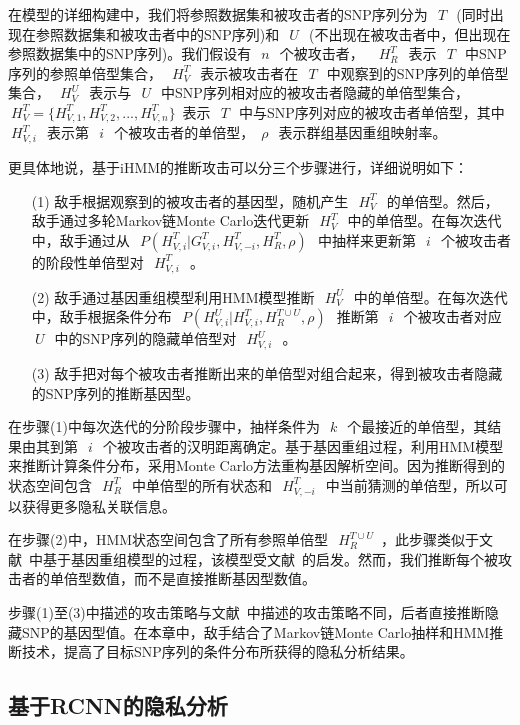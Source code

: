在模型的详细构建中，我们将参照数据集和被攻击者的SNP序列分为~$~T~$~(同时出现在参照数据集和被攻击者中的SNP序列)和~$~U~$~(不出现在被攻击者中，但出现在参照数据集中的SNP序列)。我们假设有~$~n~$~个被攻击者， ~$~H_R^T~$~表示~$~T~$~中SNP序列的参照单倍型集合，~$~H_V^T~$~表示被攻击者在~$~T~$~中观察到的SNP序列的单倍型集合，~$~H_V^U~$~表示与~$~U~$~中SNP序列相对应的被攻击者隐藏的单倍型集合，~$~H_V^T=\{H_{V,1}^T,H_{V,2}^T,..., H_{V,n}^T\}$~表示~$~T~$~中与SNP序列对应的被攻击者单倍型，其中~$~H_{V,i}^T~$~表示第~$~i~$~个被攻击者的单倍型，~$\rho~$~表示群组基因重组映射率。

更具体地说，基于iHMM的推断攻击可以分三个步骤进行，详细说明如下：
\begin{enumerate}
	\item[(1)] 敌手根据观察到的被攻击者的基因型，随机产生~$~H_V^T~$~的单倍型。然后，敌手通过多轮Markov链Monte Carlo迭代更新~$~H_V^T~$~中的单倍型。在每次迭代中，敌手通过从~$~P(H_{V,i}^T|G_{V,i}^T,H_{V,-i}^T,H_R^T,\rho)~$~中抽样来更新第~$~i~$~个被攻击者的阶段性单倍型对~$~H_{V,i}^T~$~。
	\item[(2)] 敌手通过基因重组模型利用HMM模型推断~$~H_V^U~$~中的单倍型。在每次迭代中，敌手根据条件分布~$~P(H_{V,i}^U|H_{V,i}^T, H_R^{T \cup U},\rho)~$~推断第~$~i~$~个被攻击者对应~$~U~$~中的SNP序列的隐藏单倍型对~$~H_{V,i}^U~$~。 
	\item[(3)] 敌手把对每个被攻击者推断出来的单倍型对组合起来，得到被攻击者隐藏的SNP序列的推断基因型。
\end{enumerate}

在步骤(1)中每次迭代的分阶段步骤中，抽样条件为~$~k~$~个最接近的单倍型，其结果由其到第~$~i~$~个被攻击者的汉明距离确定。基于基因重组过程，利用HMM模型来推断计算条件分布，采用Monte Carlo方法重构基因解析空间。因为推断得到的状态空间包含~$~H_R^T~$~中单倍型的所有状态和~$~H_{V,-i}^T~$~中当前猜测的单倍型，所以可以获得更多隐私关联信息。

在步骤(2)中，HMM状态空间包含了所有参照单倍型~$~H_R^{T \cup U}$~，此步骤类似于文献~\cite{samani2015quantifying}中基于基因重组模型的过程，该模型受文献~\cite{marchini2007newa}的启发。然而，我们推断每个被攻击者的单倍型数值，而不是直接推断基因型数值。

步骤(1)至(3)中描述的攻击策略与文献~\cite{samani2015quantifying}中描述的攻击策略不同，后者直接推断隐藏SNP的基因型值。在本章中，敌手结合了Markov链Monte Carlo抽样和HMM推断技术，提高了目标SNP序列的条件分布所获得的隐私分析结果。

\subsection{基于RCNN的隐私分析}

